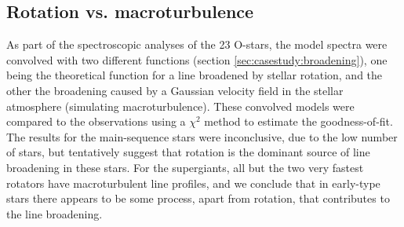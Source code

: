 \subsection{Rotation vs. macroturbulence}

As part of the spectroscopic analyses of the 23 O-stars, the model
spectra were convolved with two different functions (section
\ref{sec:casestudy:broadening}), one being the theoretical function for
a line broadened by stellar rotation, and the other the broadening
caused by a Gaussian velocity field in the stellar atmosphere
(simulating macroturbulence). These convolved models were compared to
the observations using a $\chi^2$ method to estimate the
goodness-of-fit. The results for the main-sequence stars were
inconclusive, due to the low number of stars, but tentatively suggest
that rotation is the dominant source of line broadening in these
stars. For the supergiants, all but the two very fastest rotators have
macroturbulent line profiles, and we conclude that in early-type stars
there appears to be some process, apart from rotation, that
contributes to the line broadening.


